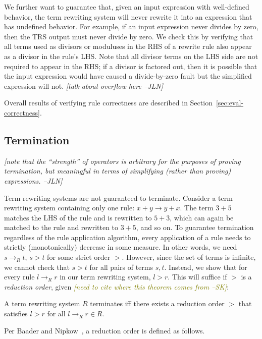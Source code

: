 \documentclass[sigplan,10pt,review,anonymous]{acmart}\settopmatter{printfolios=true,printccs=false,printacmref=false}
\newcommand{\jln}[1]{\textcolor{uwpurple}{\textit{[{#1} --JLN]}}}
\newcommand{\sak}[1]{\textcolor{olive}{\textit{[{#1} --SK]}}}
\begin{document}
We further want to guarantee that, given an input expression with well-defined
behavior, the term rewriting system will never rewrite it into an expression that has
undefined behavior. For example, if an input expression never divides by zero, then the
TRS output must never divide by zero. We check this by
verifying that all terms used as divisors or moduluses in the RHS of a
rewrite rule also appear as a divisor in the rule's LHS. Note that all divisor
terms on the LHS side are not required to appear in the RHS; if a divisor is
factored out, then it is possible that the input expression would have caused a
divide-by-zero fault but the simplified expression will not. \jln{talk about
  overflow here}

Overall results of verifying rule correctness are described in Section~\ref{sec:eval-correctness}.

\subsection{Termination}

\jln{note that the ``strength'' of operators is arbitrary for the purposes of proving termination, but meaningful in terms of simplifying (rather than proving) expressions.}

Term rewriting systems are not guaranteed to terminate. Consider a term
rewriting system containing only one rule: $x + y \rightarrow y + x$. The term
$3 + 5$ matches the LHS of the rule and is rewritten to $5 + 3$, which can again
be matched to the rule and rewritten to $3 + 5$, and so on. To guarantee
termination regardless of the rule application algorithm, every application of
a rule needs to strictly (monotonically) decrease in some measure. In other
words, we need $s \rightarrow_R t$, $s > t$ for some strict order $>$. However, since
the set of terms is infinite, we cannot check that $s > t$ for all pairs of
terms $s, t$. Instead, we show that for every rule $l \rightarrow_R r$ in our
term rewriting system, $l > r$. This will suffice if $>$ is a \emph{reduction
  order}, given \sak{need to cite where this theorem comes from}:

\begin{theorem}\label{theorem:terminates}
A term rewriting system $R$ terminates iff there exists a reduction order $>$ that satisfies $l > r$ for all $l \rightarrow_R r \in R$.
\end{theorem}

Per Baader and Nipkow~\cite{baader1999term}, a reduction order is defined as follows.
\end{document}
